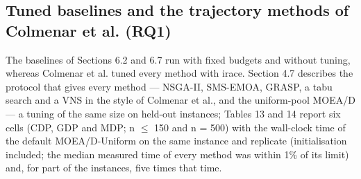 \subsection{Tuned baselines and the trajectory methods of Colmenar et al. (RQ1)}\label{sec:tuned_baselines_and_the_traj}

The baselines of Sections 6.2 and 6.7 run with fixed budgets and without tuning, whereas Colmenar et al. tuned every method with irace. Section 4.7 describes the protocol that gives every method --- NSGA-II, SMS-EMOA, GRASP, a tabu search and a VNS in the style of Colmenar et al., and the uniform-pool MOEA/D --- a tuning of the same size on held-out instances; Tables 13 and 14 report six cells (CDP, GDP and MDP; n $\leq$ 150 and n = 500) with the wall-clock time of the default MOEA/D-Uniform on the same instance and replicate (initialisation included; the median measured time of every method was within 1\% of its limit) and, for part of the instances, five times that time.

